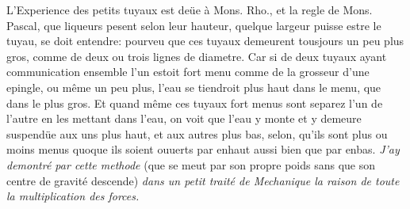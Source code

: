              \pstart L'Experience des petits tuyaux est de\"{u}e \`{a} Mons. Rho.\protect{}, et la regle de Mons. Pascal\protect{}, que  liqueurs pesent selon leur hauteur,  quelque largeur puisse estre le tuyau, se doit entendre: pourveu que ces tuyaux demeurent  tousjours un peu plus gros, comme de deux ou trois lignes de diametre. Car si de deux tuyaux ayant communication ensemble  l'un estoit fort menu comme de la grosseur d'une epingle, ou même un peu plus, l'eau se tiendroit plus haut dans le menu, que  dans le plus gros. Et quand même ces tuyaux fort menus sont separez l'un de l'autre en les mettant dans l'eau, on voit que  l'eau y monte et y demeure suspend\"{u}e aux uns plus haut, et aux autres plus bas, selon, qu'ils sont plus ou moins  menus quoque ils soient ouuerts par enhaut aussi bien que par enbas.\pend \pstart {}\protect{} \textit{J'ay demontr\'{e} par cette methode} (que  se meut par son propre poids sans  que son centre de gravit\'{e}\protect{}\protect{} descende) \textit{dans un petit trait\'{e} de Mechanique la raison de toute la multiplication des forces.}\pend